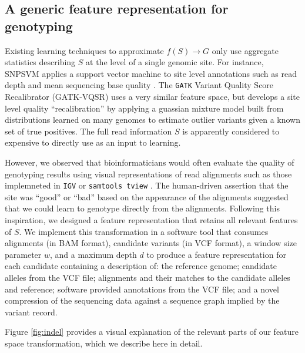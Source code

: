 \documentclass{article}
\begin{document}
\subsection{A generic feature representation for genotyping}

Existing learning techniques to approximate $f(S) \to G$ only use aggregate statistics describing $S$ at the level of a single genomic site.
For instance, SNPSVM applies a support vector machine to site level annotations such as read depth and mean sequencing base quality \cite{o2013support}.
The {\tt GATK} Variant Quality Score Recalibrator (GATK-VQSR) uses a very similar feature space, but develops a site level quality ``recalibration'' by applying a guassian mixture model built from distributions learned on many genomes to estimate outlier variants given a known set of true positives.
The full read information $S$ is apparently considered to expensive to directly use as an input to learning.

However, we observed that bioinformaticians would often evaluate the quality of genotyping results using visual representations of read alignments such as those implemneted in {\tt IGV} or {\tt samtools tview} \cite{robinson2011integrative, samtools}.
The human-driven assertion that the site was ``good'' or ``bad'' based on the appearance of the alignments suggested that we could learn to genotype directly from the alignments.
Following this inspiration, we designed a feature representation that retains all relevant features of $S$.
We implement this transformation in a software tool that consumes alignments (in BAM format), candidate variants (in VCF format), a window size parameter $w$, and a maximum depth $d$ to produce a feature representation for each candidate containing a description of: the reference genome; candidate alleles from the VCF file; alignments and their matches to the candidate alleles and reference; software provided annotations from the VCF file; and a novel compression of the sequencing data against a sequence graph implied by the variant record.

Figure \ref{fig:indel} provides a visual explanation of the relevant parts of our feature space transformation, which we describe here in detail.
\end{document}
